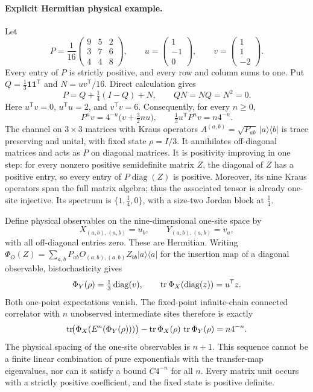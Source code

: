 \documentclass{article}
\begin{document}
\paragraph{Explicit Hermitian physical example.}
Let
\[
    P=\frac1{16}\begin{pmatrix}9&5&2\\3&7&6\\4&4&8\end{pmatrix},
    \qquad u=\begin{pmatrix}1\\-1\\0\end{pmatrix},
    \qquad v=\begin{pmatrix}1\\1\\-2\end{pmatrix}.
\]
Every entry of $P$ is strictly positive, and every row and column sums to one.
Put $Q=\frac13\boldsymbol 1\boldsymbol 1^{\mathsf T}$ and
$N=uv^{\mathsf T}/16$. Direct calculation gives
\[
    P=Q+\tfrac14(I-Q)+N,\qquad QN=NQ=N^2=0.
\]
Here $u^{\mathsf T}v=0$, $u^{\mathsf T}u=2$, and $v^{\mathsf T}v=6$.
Consequently, for every $n\geq0$,
\[
    P^n v=4^{-n}\bigl(v+\tfrac32 n u\bigr),\qquad
    \tfrac13u^{\mathsf T}P^n v=n4^{-n}.
\]
The channel on $3\times3$ matrices with Kraus operators
$A^{(a,b)}=\sqrt{P_{ab}}\,|a\rangle\langle b|$ is trace preserving and unital,
with fixed state $\rho=I/3$. It annihilates off-diagonal matrices and acts as
$P$ on diagonal matrices. It is positivity improving in one step: for every
nonzero positive semidefinite matrix $Z$, the diagonal of $Z$ has a positive
entry, so every entry of $P\operatorname{diag}(Z)$ is positive.
Moreover, its nine Kraus operators span the full matrix algebra; thus the
associated tensor is already one-site injective. Its spectrum is
$\{1,\tfrac14,0\}$, with a size-two Jordan block at $\tfrac14$.

Define physical observables on the nine-dimensional one-site space by
\[
    X_{(a,b),(a,b)}=u_b,\qquad Y_{(a,b),(a,b)}=v_a,
\]
with all off-diagonal entries zero. These are Hermitian. Writing
$\Phi_O(Z)=\sum_{a,b}P_{ab}O_{(a,b),(a,b)}Z_{bb}|a\rangle\langle a|$
for the insertion map of a diagonal observable, bistochasticity gives
\[
    \Phi_Y(\rho)=\tfrac13\operatorname{diag}(v),\qquad
    \operatorname{tr}\Phi_X(\operatorname{diag}(z))=u^{\mathsf T}z.
\]
Both one-point expectations vanish. The fixed-point infinite-chain connected
correlator with $n$ unobserved intermediate sites therefore is exactly
\[
    \operatorname{tr}\!\bigl(\Phi_X(E^n(\Phi_Y(\rho)))\bigr)
    -\operatorname{tr}\Phi_X(\rho)\,\operatorname{tr}\Phi_Y(\rho)=n4^{-n}.
\]
The physical spacing of the one-site observables is $n+1$. This sequence
cannot be a finite linear combination of pure exponentials with the
transfer-map eigenvalues, nor can it satisfy a bound $C4^{-n}$ for all $n$.
Every matrix unit occurs with a strictly positive coefficient, and the
fixed state is positive definite.
\end{document}
